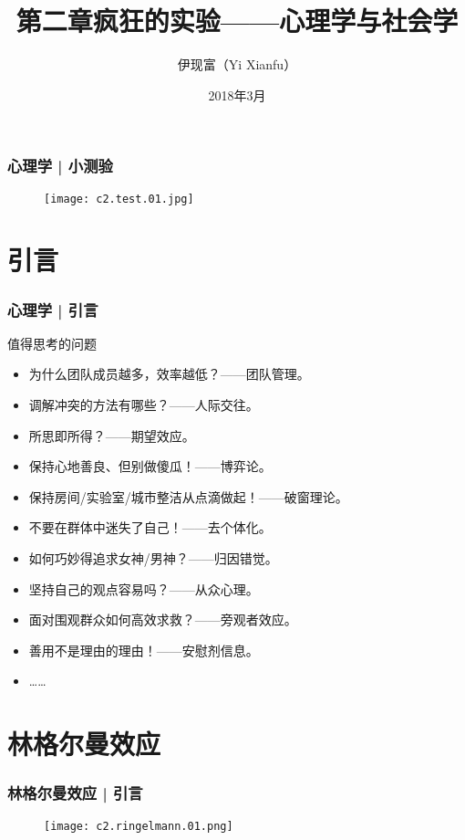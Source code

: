 



\title[心理学与社会学]{第二章\quad 疯狂的实验——心理学与社会学}
\author[Yixf]{伊现富（Yi Xianfu）}
\date{2018年3月}



\begin{frame}
  \frametitle{心理学 | 小测验}
  \begin{figure}
    \centering
    \texttt{[image: c2.test.01.jpg]}
  \end{figure}
\end{frame}

\section{引言}
\begin{frame}
  \frametitle{心理学 | 引言}
  \begin{block}{值得思考的问题}
    \begin{itemize}
      \item 为什么团队成员越多，效率越低？——团队管理。
      \item 调解冲突的方法有哪些？——人际交往。
      \item 所思即所得？——期望效应。
      \item 保持心地善良、但别做傻瓜！——博弈论。
      \item 保持房间/实验室/城市整洁从点滴做起！——破窗理论。
      \item 不要在群体中迷失了自己！——去个体化。
      \item 如何巧妙得追求女神/男神？——归因错觉。
      \item 坚持自己的观点容易吗？——从众心理。
      \item 面对围观群众如何高效求救？——旁观者效应。
      \item 善用不是理由的理由！——安慰剂信息。
      \item ……
    \end{itemize}
  \end{block}
\end{frame}

\section{林格尔曼效应}
\begin{frame}
  \frametitle{林格尔曼效应 | 引言}
  \begin{figure}
    \centering
    \texttt{[image: c2.ringelmann.01.png]}
  \end{figure}
\end{frame}

